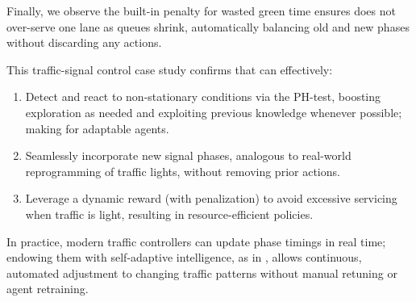 Finally, we observe the built-in penalty for wasted green time ensures \adaptiverl does not over-serve 
one lane as queues shrink, automatically balancing old and new phases without discarding any 
actions.

This traffic-signal control case study confirms that \adaptiverl can effectively:
\begin{enumerate}
  \item Detect and react to non-stationary conditions via the PH-test, boosting exploration as needed 
  and exploiting previous knowledge whenever possible; making for adaptable agents.
  \item Seamlessly incorporate new signal phases, analogous to real-world reprogramming of traffic 
  lights, without removing prior actions.
  \item Leverage a dynamic reward (with penalization) to avoid excessive servicing when traffic is light, 
  resulting in resource-efficient policies.
\end{enumerate}

In practice, modern traffic controllers can update phase timings in real time; endowing them with 
self-adaptive intelligence, as in \adaptiverl, allows continuous, automated adjustment to changing 
traffic patterns without manual retuning or agent retraining.


\endinput

